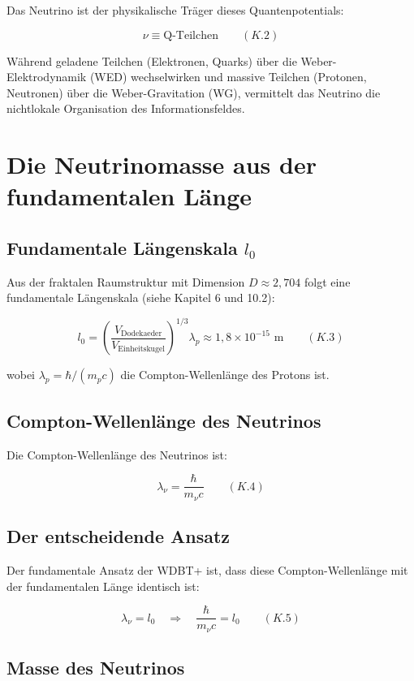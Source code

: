 Das Neutrino ist der physikalische Träger dieses Quantenpotentials:

\[
\nu \equiv \text{Q-Teilchen} \qquad (K.2)
\]

Während geladene Teilchen (Elektronen, Quarks) über die Weber-Elektrodynamik (WED) 
wechselwirken und massive Teilchen (Protonen, Neutronen) über die Weber-Gravitation (WG), 
vermittelt das Neutrino die nichtlokale Organisation des Informationsfeldes.

\section{Die Neutrinomasse aus der fundamentalen Länge}

\subsection{Fundamentale Längenskala $l_0$}

Aus der fraktalen Raumstruktur mit Dimension $D \approx 2,704$ folgt eine fundamentale 
Längenskala (siehe Kapitel 6 und 10.2):

\[
l_0 = \left( \frac{V_{\text{Dodekaeder}}}{V_{\text{Einheitskugel}}} \right)^{1/3} \lambda_p \approx 1,8 \times 10^{-15} \text{ m} \qquad (K.3)
\]

wobei $\lambda_p = \hbar/(m_p c)$ die Compton-Wellenlänge des Protons ist.

\subsection{Compton-Wellenlänge des Neutrinos}

Die Compton-Wellenlänge des Neutrinos ist:

\[
\lambda_{\nu} = \frac{\hbar}{m_{\nu}c} \qquad (K.4)
\]

\subsection{Der entscheidende Ansatz}

Der fundamentale Ansatz der WDBT+ ist, dass diese Compton-Wellenlänge mit der 
fundamentalen Länge identisch ist:

\[
\lambda_{\nu} = l_0 \quad \Rightarrow \quad \frac{\hbar}{m_{\nu}c} = l_0 \qquad (K.5)
\]

\subsection{Masse des Neutrinos}

